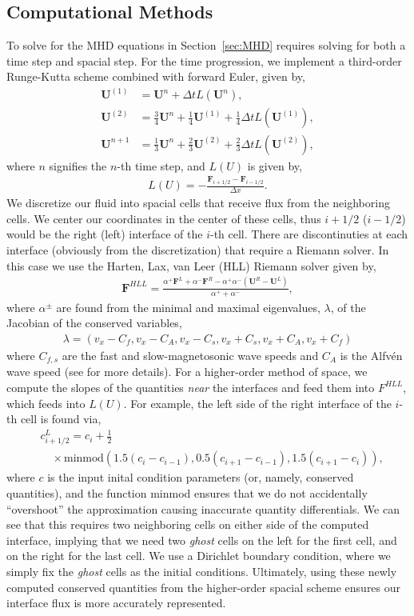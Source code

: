 \documentclass[iop,twocolumn]{emulateapj}
\begin{document}
\subsection{Computational Methods}
To solve for the MHD equations in Section~\ref{sec:MHD} requires solving for both a time step and spacial step. For the time progression, we implement a third-order Runge-Kutta scheme combined with forward Euler, given by,
\begin{align*}
  {\bm U}^{(1)}&={\bm U}^n+\Delta t L({\bm U}^n),\\
  {\bm U}^{(2)}&=\frac{3}{4}{\bm U}^n+\frac{1}{4}{\bm U}^{(1)}+\frac{1}{4}\Delta t L({\bm U}^{(1)}),\\
  {\bm U}^{n+1}&=\frac{1}{3}{\bm U}^n+\frac{2}{3}{\bm U}^{(2)}+\frac{2}{3}\Delta t L({\bm U}^{(2)}),
\end{align*}
where $n$ signifies the $n$-th time step, and $L(U)$ is given by,
\begin{align*}
  L(U)=-\frac{{\bm F}_{i+1/2}-{\bm F}_{i-1/2}}{\Delta x}.
\end{align*}
We discretize our fluid into spacial cells that receive flux from the neighboring cells. We center our coordinates in the center of these cells, thus $i+1/2$ ($i-1/2$) would be the right (left) interface of the $i$-th cell. There are discontinuties at each interface (obviously from the discretization) that require a Riemann solver. In this case we use the Harten, Lax, van Leer (HLL) Riemann solver given by,
\begin{align*}
  {\bm F}^{HLL}=\frac{\alpha^+{\bm F}^L+\alpha^-{\bm F}^R-\alpha^+\alpha^-({\bm U}^R-{\bm U}^L)}{\alpha^++\alpha^-},
\end{align*}
where $\alpha^\pm$ are found from the minimal and maximal eigenvalues, $\lambda$, of the Jacobian of the conserved variables,
\begin{align*}
  \lambda=(v_x-C_f,v_x-C_A,v_x-C_s,v_x+C_s,v_x+C_A,v_x+C_f)
\end{align*}
where $C_{f,s}$ are the fast and slow-magnetosonic wave speeds and $C_A$ is the Alfv{\'e}n wave speed (see \cite{stone08a} for more details). For a higher-order method of space, we compute the slopes of the quantities {\it near} the interfaces and feed them into $F^{HLL}$, which feeds into $L(U)$. For example,  the left side of the right interface of the $i$-th cell is found via,
\begin{align*}
  &c^L_{i+1/2}= c_i +\frac{1}{2} \\
  &\quad\times\textrm{minmod}\left(1.5(c_i-c_{i-1}),0.5(c_{i+1}-c_{i-1}),1.5(c_{i+1}-c_i)\right),
\end{align*}
where $c$ is the input inital condition parameters (or, namely, conserved quantities), and the function minmod ensures that we do not accidentally ``overshoot'' the approximation causing inaccurate quantity differentials. We can see that this requires two neighboring cells on either side of the computed interface, implying that we need two {\it ghost} cells on the left for the first cell, and on the right for the last cell. We use a Dirichlet boundary condition, where we simply fix the {\it ghost} cells as the initial conditions. Ultimately, using these newly computed conserved quantities from the higher-order spacial scheme ensures our interface flux is more accurately represented.
\end{document}
